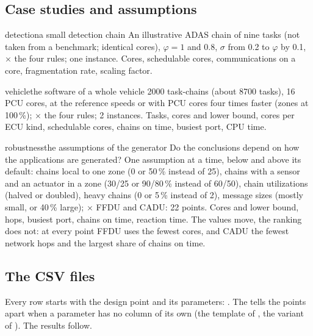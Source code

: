 \subsection{Case studies and assumptions}

\begin{experimentbox}{detection}{a small detection chain}
 An illustrative ADAS chain of nine tasks (not taken from
a benchmark; identical cores), $\varphi = 1$ and $0.8$, $\sigma$ from 0.2 to
$\varphi$ by 0.1, $\times$ the four rules; one instance.
 Cores, schedulable cores, communications on a core,
fragmentation rate, scaling factor.
\end{experimentbox}

\begin{experimentbox}{vehicle}{the software of a whole vehicle}
 2000 task-chains (about 8700 tasks), 16 PCU cores, at the
reference speeds or with PCU cores four times faster (zones at 100\,\%);
$\times$ the four rules; 2 instances.
 Tasks, cores and lower bound, cores per ECU kind,
schedulable cores, chains on time, busiest port, CPU time.
\end{experimentbox}

\begin{experimentbox}{robustness}{the assumptions of the generator}
 Do the conclusions depend on how the applications are
generated?
 One assumption at a time, below and above its default:
chains local to one zone (0 or 50\,\% instead of 25), chains with a
sensor and an actuator in a zone (30/25 or 90/80\,\% instead of 60/50),
chain utilizations (halved or doubled), heavy chains (0 or 5\,\% instead of
2), message sizes (mostly small, or 40\,\% large); $\times$ FFDU and
CADU: 22 points.
 Cores and lower bound, hops, busiest port, chains on
time, reaction time.
 The values move, the ranking does not: at every point
FFDU uses the fewest cores, and CADU the fewest network hops and the
largest share of chains on time.
\end{experimentbox}

\subsection{The CSV files}
\label{sec:ex-csv}

{\raggedright Every row starts with the design point and its parameters:
. The  tells the points
apart when a parameter has no column of its own (the template of
, the variant of ). The results follow.\par}

